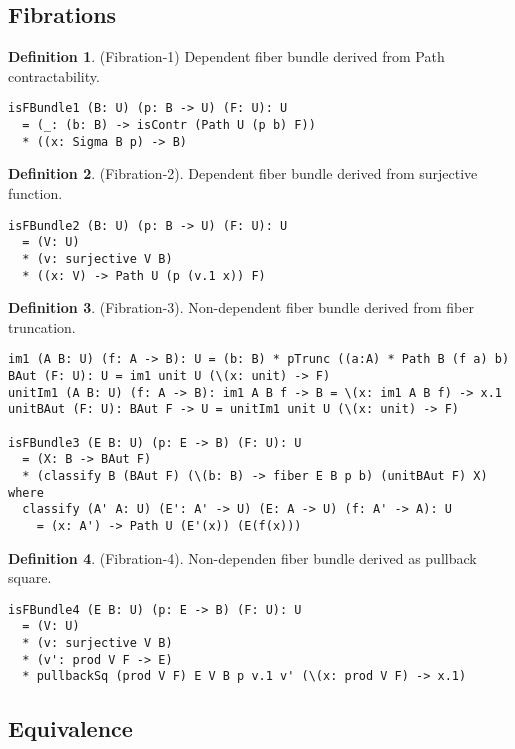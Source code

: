 \documentclass{article}
\theoremstyle{definition}
\newtheorem{definition}{Definition}
\begin{document}
\newpage
\subsection{Fibrations}

\begin{definition} (Fibration-1) Dependent fiber bundle derived from Path contractability.
\begin{lstlisting}
isFBundle1 (B: U) (p: B -> U) (F: U): U
  = (_: (b: B) -> isContr (Path U (p b) F))
  * ((x: Sigma B p) -> B)
\end{lstlisting}
\end{definition}

\begin{definition} (Fibration-2). Dependent fiber bundle derived from surjective function.
\begin{lstlisting}
isFBundle2 (B: U) (p: B -> U) (F: U): U
  = (V: U)
  * (v: surjective V B)
  * ((x: V) -> Path U (p (v.1 x)) F)
\end{lstlisting}
\end{definition}

\begin{definition} (Fibration-3). Non-dependent fiber bundle derived from fiber truncation.
\begin{lstlisting}
im1 (A B: U) (f: A -> B): U = (b: B) * pTrunc ((a:A) * Path B (f a) b)
BAut (F: U): U = im1 unit U (\(x: unit) -> F)
unitIm1 (A B: U) (f: A -> B): im1 A B f -> B = \(x: im1 A B f) -> x.1
unitBAut (F: U): BAut F -> U = unitIm1 unit U (\(x: unit) -> F)

isFBundle3 (E B: U) (p: E -> B) (F: U): U
  = (X: B -> BAut F)
  * (classify B (BAut F) (\(b: B) -> fiber E B p b) (unitBAut F) X) where
  classify (A' A: U) (E': A' -> U) (E: A -> U) (f: A' -> A): U
    = (x: A') -> Path U (E'(x)) (E(f(x)))
\end{lstlisting}
\end{definition}

\begin{definition} (Fibration-4). Non-dependen fiber bundle derived as pullback square.
\begin{lstlisting}
isFBundle4 (E B: U) (p: E -> B) (F: U): U
  = (V: U)
  * (v: surjective V B)
  * (v': prod V F -> E)
  * pullbackSq (prod V F) E V B p v.1 v' (\(x: prod V F) -> x.1)
\end{lstlisting}
\end{definition}

\newpage
\subsection{Equivalence}
\end{document}
